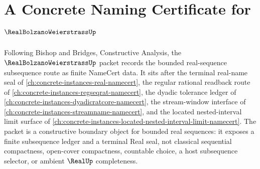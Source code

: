 \chapter{A Concrete Naming Certificate for $\RealBolzanoWeierstrassUp$}
\label{ch:concrete-instances-real-bolzano-weierstrass-namecert}

Following Bishop and Bridges, Constructive Analysis, the $\RealBolzanoWeierstrassUp$ packet records the bounded real-sequence subsequence route as finite NameCert data. It sits after the terminal real-name seal of \autoref{ch:concrete-instances-real-namecert}, the regular rational readback route of \autoref{ch:concrete-instances-regseqrat-namecert}, the dyadic tolerance ledger of \autoref{ch:concrete-instances-dyadicratcore-namecert}, the stream-window interface of \autoref{ch:concrete-instances-streamname-namecert}, and the located nested-interval limit surface of \autoref{ch:concrete-instances-located-nested-interval-limit-namecert}. The packet is a constructive boundary object for bounded real sequences: it exposes a finite subsequence ledger and a terminal Real seal, not classical sequential compactness, open-cover compactness, countable choice, a host subsequence selector, or ambient $\RealUp$ completeness.

